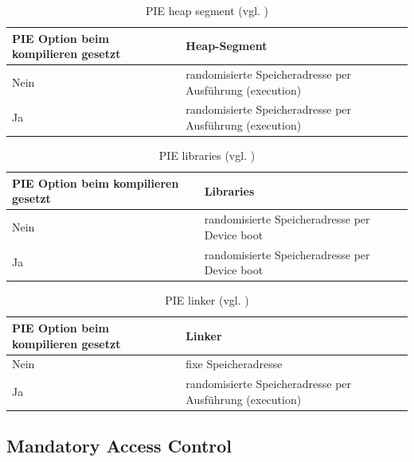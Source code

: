 \begin{table}
    \begin{center}
       \begin{tabular}{|p{4cm}|p{11cm}|} \hline
            PIE Option beim kompilieren gesetzt & Heap-Segment\\ \hline
            Nein & randomisierte Speicheradresse per Ausführung (execution)\\ \hline
            Ja & randomisierte Speicheradresse per Ausführung (execution)\\ \hline
        \end{tabular}
        \caption{PIE heap segment (vgl. \cite{iOSSec[5]}) }
       \label{tab:PIE heap segment}
    \end{center}
\end{table}

\begin{table}
    \begin{center}
      \begin{tabular}{|p{4cm}|p{11cm}|} \hline
            PIE Option beim kompilieren gesetzt & Libraries \\ \hline
            Nein & randomisierte Speicheradresse per Device boot\\ \hline
            Ja & randomisierte Speicheradresse per Device boot \\ \hline
        \end{tabular}
        \caption{PIE libraries (vgl. \cite{iOSSec[5]})}
       \label{tab:PIE libraries}
    \end{center}
\end{table}

 \begin{table}
    \begin{center}
        \begin{tabular}{|p{4cm}|p{11cm}|} \hline
            PIE Option beim kompilieren gesetzt & Linker  \\ \hline
            Nein & fixe Speicheradresse \\ \hline
            Ja & randomisierte Speicheradresse per Ausführung (execution)\\ \hline
        \end{tabular}
        \caption{PIE linker (vgl. \cite{iOSSec[5]})}
       \label{tab:PIE linker }
    \end{center}
\end{table}

\subsection{Mandatory Access Control}
\label{sec:MAC}

